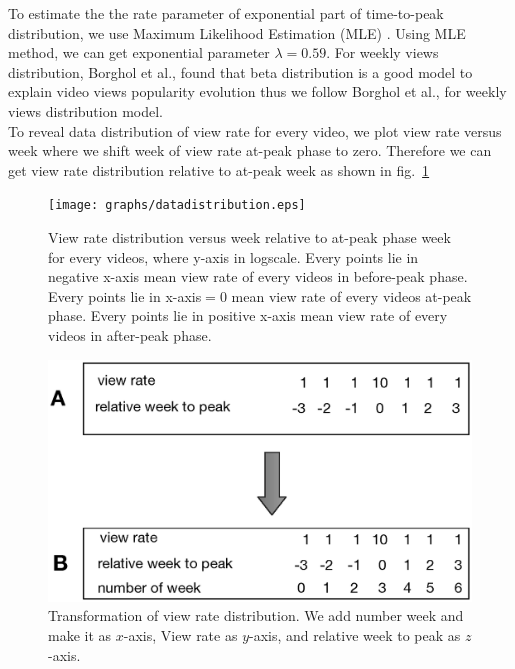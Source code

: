 \documentclass[10pt,final,journal,a4paper]{IEEEtran}
\begin{document}
To estimate the the rate parameter of exponential part of time-to-peak distribution, we use Maximum Likelihood Estimation (MLE) \cite{clauset2009power}.
Using MLE method, we can get exponential parameter $\lambda = 0.59$.
For weekly views distribution, Borghol et al., \cite{Borghol:2011:CMP:2039452.2039717} found that beta distribution is a good model to explain video views popularity evolution thus we follow Borghol et al., \cite{Borghol:2011:CMP:2039452.2039717} for  weekly views distribution model.\\
To reveal data distribution of view rate for every video, we plot view rate versus week where we shift week of view rate at-peak phase to zero. 
Therefore we can get view rate distribution relative to at-peak week as shown in fig.~\ref{fig:viewratedistribution}

\begin{figure}[!t]
\begin{center}
\texttt{[image: graphs/datadistribution.eps]}
\end{center}
\caption{View rate distribution versus week relative to at-peak phase week for every videos, where y-axis in logscale.
Every points lie in negative x-axis mean view rate of every videos in before-peak phase.
Every points lie in x-axis$=0$ mean view rate of every videos at-peak phase. 
Every points lie in positive x-axis mean view rate of every videos in after-peak phase. }
\label{fig:viewratedistribution}
\end{figure} 


\begin{figure}[!t]
\begin{center}
\includegraphics[scale=0.5]{graphs/transformasi.eps}
\end{center}
\caption{Transformation of view rate distribution. We add number week and make it as $x$-axis, View rate as $y$-axis, and relative week to peak as $z$-axis.}
\label{fig:viewratedistexample}
\end{figure} 
\end{document}
